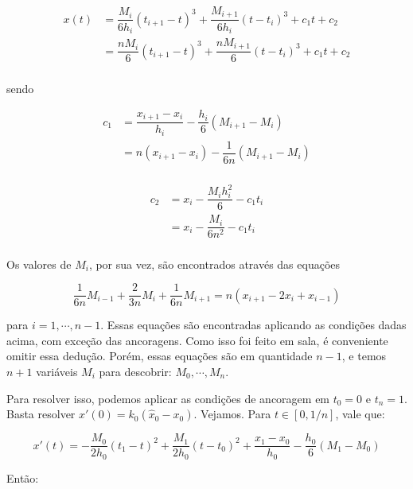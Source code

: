 \documentclass{article}
\begin{document}
\begin{enumerate}
\begin{enumerate}
                    \begin{align*}
                        x(t) &= \dfrac{M_i}{6h_i}(t_{i+1}-t)^3 + \dfrac{M_{i+1}}{6h_i}(t-t_i)^3 + c_1t+c_2 \\
                        &= \dfrac{nM_i}{6}(t_{i+1}-t)^3 + \dfrac{nM_{i+1}}{6}(t-t_i)^3 + c_1t+c_2 \\
                    \end{align*}

                    sendo

                    \begin{align*}
                        c_1 &= \dfrac{x_{i+1}-x_i}{h_i} -\dfrac{h_i}{6}(M_{i+1}-M_i) \\
                        &= n(x_{i+1}-x_i) -\dfrac{1}{6n}(M_{i+1}-M_i) \\
                    \end{align*}

                    \begin{align*}
                        c_2 &= x_i - \dfrac{M_i h_i^2}{6} - c_1 t_i \\
                        &= x_i - \dfrac{M_i}{6n^2} - c_1 t_i \\
                    \end{align*}
                    
                    Os valores de $M_i$, por sua vez, são encontrados através das equações

                    $$\dfrac{1}{6n}M_{i-1} + \dfrac{2}{3n}M_i + \dfrac{1}{6n}M_{i+1} = n(x_{i+1} - 2x_i + x_{i-1})$$

                    para $i = 1, \cdots, n-1$. Essas equações são encontradas aplicando as condições
                    dadas acima, com exceção das ancoragens. Como isso foi feito em sala,
                    é conveniente omitir essa dedução. Porém, essas equações são em quantidade
                    $n-1$, e temos $n+1$ variáveis $M_i$ para descobrir: $M_0, \cdots, M_n$.

                    Para resolver isso, podemos aplicar as condições de ancoragem em $t_0 = 0$ e $t_n = 1$.
                    Basta resolver $x'(0) = k_0(\hat{x}_0 - x_0)$. Vejamos. Para $t \in [0, 1/n]$, vale que:

                    $$x'(t) = -\dfrac{M_0}{2h_0}(t_1 - t)^2 + \dfrac{M_1}{2h_0}(t-t_0)^2 + \dfrac{x_1 - x_0}{h_0} - \dfrac{h_0}{6}(M_1 - M_0)$$

                    Então:


\end{enumerate}
\end{enumerate}
\end{document}

